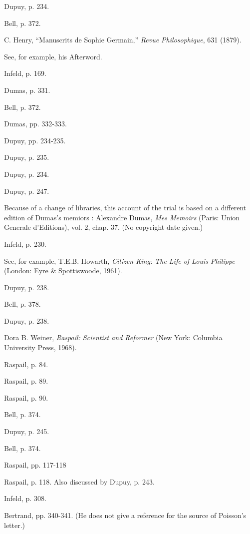 \documentclass[12pt]{article}
\begin{document}
\begin{thebibliography}{9999}
 Dupuy, p. 234. 

 Bell, p. 372. 

 C. Henry, ``Manuscrits de Sophie Germain,'' \emph{Revue Philosophique}, 631 (1879). 

 See, for example, his Afterword. 

 Infeld, p. 169. 

 Dumas, p. 331. 

 Bell, p. 372. 

 Dumas, pp. 332-333. 

 Dupuy, pp. 234-235. 

 Dupuy, p. 235. 

 Dupuy, p. 234. 

 Dupuy, p. 247. 

 Because of a change of libraries, this account of the trial is based on a different edition of Dumas's memiors
: Alexandre Dumas, {\it Mes Memoirs} (Paris: Union Generale d'Editions), vol. 2, chap. 37. (No copyright date given.) 

 Infeld, p. 230. 

 See, for example, T.E.B. Howarth, \emph{Citizen King: The Life of Louis-Philippe} (London: Eyre \&
Spottiswoode, 1961). 

 Dupuy, p. 238. 

 Bell, p. 378. 

 Dupuy, p. 238. 

 Dora B. Weiner, \emph{Raspail: Scientist and Reformer} (New York: Columbia University Press, 1968). 

 Raspail, p. 84. 

 Raspail, p. 89. 

 Raspail, p. 90. 

 Bell, p. 374. 

 Dupuy, p. 245. 

 Bell, p. 374. 

 Raspail, pp. 117-118 

 Raspail, p. 118. Also discussed by Dupuy, p. 243. 

 Infeld, p. 308. 

 Bertrand, pp. 340-341. (He does not give a reference for the source of Poisson's letter.) 


\end{thebibliography}
\end{document}
